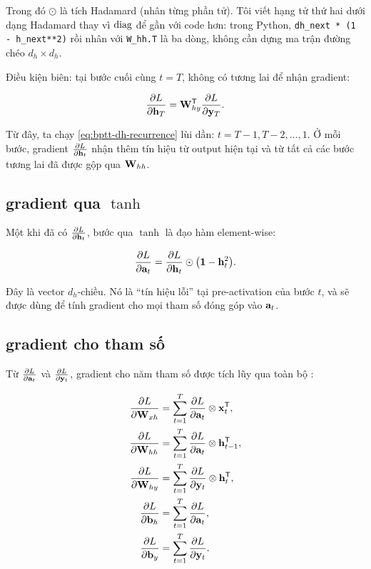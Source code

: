Trong đó $\odot$ là tích Hadamard (nhân từng phần tử). Tôi viết hạng tử thứ
hai dưới dạng Hadamard thay vì $\operatorname{diag}$ để gần với code hơn: trong Python,
\texttt{dh_next * (1 - h_next**2)} rồi nhân với
\texttt{W_hh.T} là ba dòng, không cần dựng ma trận đường chéo
$d_h \times d_h$.

Điều kiện biên: tại bước cuối cùng $t = T$, không có tương lai để nhận
gradient:

\begin{equation}
  \frac{\partial L}{\partial \mathbf{h}_T}
  = \mathbf{W}_{hy}^{\mathsf{T}} \frac{\partial L}{\partial \mathbf{y}_T}.
  \label{eq:bptt-dhT}
\end{equation}

Từ đây, ta chạy \eqref{eq:bptt-dh-recurrence} lùi dần: $t = T-1, T-2, \dots,
1$. Ở mỗi bước, gradient $\frac{\partial L}{\partial \mathbf{h}_t}$ nhận thêm tín hiệu từ output
hiện tại và từ tất cả các bước tương lai đã được gộp qua $\mathbf{W}_{hh}$.

\subsection{ gradient qua $\tanh$}

Một khi đã có $\frac{\partial L}{\partial \mathbf{h}_t}$, bước qua $\tanh$ là đạo hàm element-wise:

\begin{equation}
  \frac{\partial L}{\partial \mathbf{a}_t}
  = \frac{\partial L}{\partial \mathbf{h}_t}
    \odot \bigl(\mathbf{1} - \mathbf{h}_t^2\bigr).
  \label{eq:bptt-da}
\end{equation}

Đây là vector $d_h$-chiều. Nó là ``tín hiệu lỗi'' tại pre-activation của
bước $t$, và sẽ được dùng để tính gradient cho mọi tham số đóng góp vào
$\mathbf{a}_t$.

\subsection{ gradient cho tham số}

Từ $\frac{\partial L}{\partial \mathbf{a}_t}$ và $\frac{\partial L}{\partial \mathbf{y}_t}$, gradient cho năm tham số
được tích lũy qua toàn bộ :

\begin{align}
  \frac{\partial L}{\partial \mathbf{W}_{xh}} &= \sum_{t=1}^{T}
    \frac{\partial L}{\partial \mathbf{a}_t} \otimes \mathbf{x}_t^{\mathsf{T}},
    \label{eq:bptt-dWxh} \\
  \frac{\partial L}{\partial \mathbf{W}_{hh}} &= \sum_{t=1}^{T}
    \frac{\partial L}{\partial \mathbf{a}_t} \otimes \mathbf{h}_{t-1}^{\mathsf{T}},
    \label{eq:bptt-dWhh} \\
  \frac{\partial L}{\partial \mathbf{W}_{hy}} &= \sum_{t=1}^{T}
    \frac{\partial L}{\partial \mathbf{y}_t} \otimes \mathbf{h}_t^{\mathsf{T}},
    \label{eq:bptt-dWhy} \\
  \frac{\partial L}{\partial \mathbf{b}_h} &= \sum_{t=1}^{T}
    \frac{\partial L}{\partial \mathbf{a}_t},
    \label{eq:bptt-dbh} \\
  \frac{\partial L}{\partial \mathbf{b}_y} &= \sum_{t=1}^{T}
    \frac{\partial L}{\partial \mathbf{y}_t}.
    \label{eq:bptt-dby}
\end{align}

